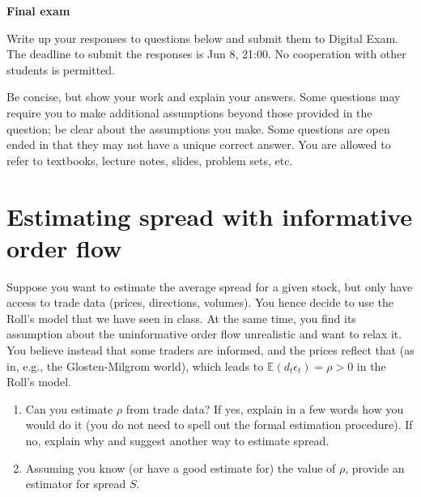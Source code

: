 \documentclass[a4paper]{article}
\newif\ifsolutions
\begin{document}
{\ifsolutions \else	
	
\fi}

\begin{center}
		\LARGE\textbf{Final exam {\ifsolutions solutions \fi}}
\end{center}

{\ifsolutions \else	
Write up your responses to questions below and submit them to Digital Exam. The deadline to submit the responses is Jun 8, 21:00. No cooperation with other students is permitted.

Be concise, but show your work and explain your answers. Some questions may require you to make additional assumptions beyond those provided in the question; be clear about the assumptions you make. Some questions are open ended in that they may not have a unique correct answer. You are allowed to refer to textbooks, lecture notes, slides, problem sets, etc.
\fi}



\section{Estimating spread with informative order flow}

Suppose you want to estimate the average spread for a given stock, but only have access to trade data (prices, directions, volumes). You hence decide to use the Roll's model that we have seen in class. At the same time, you find its assumption about the uninformative order flow unrealistic and want to relax it.
You believe instead that some traders are informed, and the prices reflect that (as in, e.g., the Glosten-Milgrom world), which leads to $\mathbb{E}(d_t \epsilon_{t})=\rho > 0$ in the Roll's model.
\begin{enumerate}
	\item Can you estimate $\rho$ from trade data? If yes, explain in a few words how you would do it (you do not need to spell out the formal estimation procedure). If no, explain why and suggest another way to estimate spread.
	\item Assuming you know (or have a good estimate for) the value of $\rho$, provide an estimator for spread $S$.
\end{enumerate}
\end{document}
